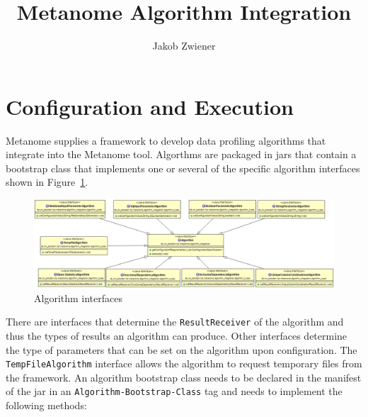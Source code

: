 \documentclass[10pt,a4paper]{article}
\author{Jakob Zwiener}
\title{Metanome Algorithm Integration}
\begin{document}
\maketitle

\section{Configuration and Execution}
\label{sec_configurationAndExecution}

Metanome supplies a framework to develop data profiling algorithms that integrate into the Metanome tool. Algorthms are packaged in jars that contain a bootstrap class that implements one or several of the specific algorithm interfaces shown in Figure~\ref{fig_algorithmClass}.
\begin{figure}[h]
\includegraphics[width=\textwidth]{algorithm_class}
\caption{Algorithm interfaces}
\label{fig_algorithmClass}
\end{figure}
There are interfaces that determine the \texttt{ResultReceiver} of the algorithm and thus the types of results an algorithm can produce. Other interfaces determine the type of parameters that can be set on the algorithm upon configuration. The \texttt{TempFileAlgorithm} interface allows the algorithm to request temporary files from the framework. An algorithm bootstrap class needs to be declared in the manifest of the jar in an \texttt{Algorithm-Bootstrap-Class} tag and needs to implement the following methods:
\end{document}
